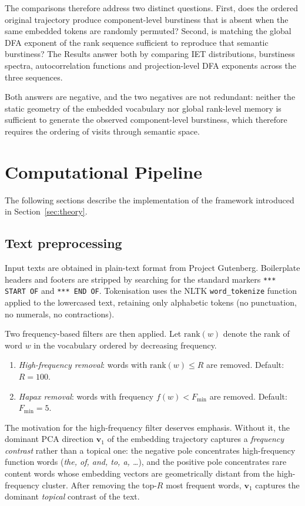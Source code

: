 \documentclass[preprint]{elsarticle}
\begin{document}
The comparisons therefore address two distinct questions.
First, does the ordered original trajectory produce component-level
burstiness that is absent when the same embedded tokens are randomly
permuted?
Second, is matching the global DFA exponent of the rank sequence
sufficient to reproduce that semantic burstiness?
The Results answer both by comparing IET distributions, burstiness
spectra, autocorrelation functions and projection-level DFA exponents
across the three sequences.

Both answers are negative, and the two negatives are not redundant:
neither the static geometry of the embedded vocabulary nor global
rank-level memory is sufficient to generate the observed
component-level burstiness, which therefore requires the ordering of
visits through semantic space.



\section{Computational Pipeline}
\label{sec:pipeline}

The following sections describe the implementation of the framework
introduced in Section~\ref{sec:theory}.

\subsection{Text preprocessing}
\label{sec:preprocessing}
\label{sec:filtering_results}

Input texts are obtained in plain-text format from Project Gutenberg.
Boilerplate headers and footers are stripped by searching for the
standard markers \texttt{*** START OF} and \texttt{*** END OF}.
Tokenisation uses the NLTK \texttt{word\_tokenize} function applied to
the lowercased text, retaining only alphabetic tokens (no punctuation,
no numerals, no contractions).

Two frequency-based filters are then applied.
Let $\mathrm{rank}(w)$ denote the rank of word $w$ in the vocabulary
ordered by decreasing frequency.
\begin{enumerate}
  \item \emph{High-frequency removal}: words with
        $\mathrm{rank}(w) \leq R$ are removed.
        Default: $R = 100$.
  \item \emph{Hapax removal}: words with frequency $f(w) < F_{\min}$
        are removed.
        Default: $F_{\min} = 5$.
\end{enumerate}
The motivation for the high-frequency filter deserves emphasis.
Without it, the dominant PCA direction $\mathbf{v}_1$ of the embedding
trajectory captures a \emph{frequency contrast} rather than a topical
one: the negative pole concentrates high-frequency function words
(\emph{the, of, and, to, a, \ldots}), and the positive pole concentrates
rare content words whose embedding vectors are geometrically distant
from the high-frequency cluster.
After removing the top-$R$ most frequent words, $\mathbf{v}_1$
captures the dominant \emph{topical} contrast of the text.
\end{document}
